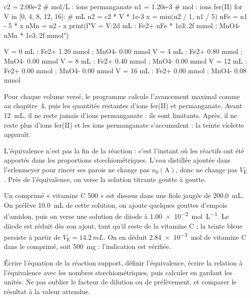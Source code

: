 \begin{python}
c2 = 2.00e-2      # mol/L : ions permanganate
n1 = 1.20e-3      # mol : ions fer(II)
for V in [0, 4, 8, 12, 16]:          # mL
    n2 = c2 * V * 1e-3
    x = min(n2 / 1, n1 / 5)
    nFe = n1 - 5 * x
    nMn = n2 - x
    print(f"V = {V:2d} mL : Fe2+ {nFe * 1e3:.2f} mmol ; MnO4- {nMn * 1e3:.2f} mmol")
\end{python}
\begin{console}
V =  0 mL : Fe2+ 1.20 mmol ; MnO4- 0.00 mmol
V =  4 mL : Fe2+ 0.80 mmol ; MnO4- 0.00 mmol
V =  8 mL : Fe2+ 0.40 mmol ; MnO4- 0.00 mmol
V = 12 mL : Fe2+ 0.00 mmol ; MnO4- 0.00 mmol
V = 16 mL : Fe2+ 0.00 mmol ; MnO4- 0.08 mmol
\end{console}
\noindent{} Pour chaque volume versé, le programme calcule l'avancement maximal  comme au chapitre~4, puis
les quantités restantes d'ions fer(II) et permanganate. Avant \qty{12}{mL}, il ne reste jamais d'ions permanganate : ils sont
limitants. Après, il ne reste plus d'ions fer(II) et les ions permanganate s'accumulent : la teinte violette apparaît.
\begin{attention}
L'équivalence n'est pas la fin de la réaction : c'est l'instant où les réactifs ont été apportés dans les proportions
stœchiométriques. L'eau distillée ajoutée dans l'erlenmeyer pour rincer ses parois ne change pas $n_0(\mathrm{A})$, donc ne
change pas $V_\mathrm{E}$. Près de l'équivalence, on verse la solution titrante goutte à goutte.
\end{attention}
\begin{experience}
Un comprimé « vitamine C 500 » est dissous dans une fiole jaugée de \qty{200,0}{mL}. On prélève \qty{10,0}{mL} de cette solution, on
ajoute quelques gouttes d'empois d'amidon, puis on verse une solution de diiode à \qty{1,00e-2}{mol.L^{-1}}. Le diiode est réduit
dès son ajout, tant qu'il reste de la vitamine C ; la teinte bleue persiste à partir de $V_\mathrm{E}=\qty{14,2}{mL}$. On en déduit
\qty{2,84e-3}{mol} de vitamine C dans le comprimé, soit \qty{500}{mg} : l'indication est vérifiée.
\end{experience}
\begin{rediger}
Écrire l'équation de la réaction support, définir l'équivalence, écrire la relation à l'équivalence avec les nombres
stœchiométriques, puis calculer en gardant les unités. Ne pas oublier le facteur de dilution ou de prélèvement, et
comparer le résultat à la valeur attendue.
\end{rediger}
\exercices

